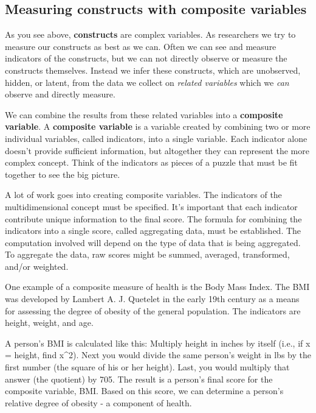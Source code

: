 \documentclass[]{book}
\theoremstyle{definition}
\theoremstyle{definition}
\theoremstyle{definition}
\theoremstyle{remark}
\begin{document}
\hypertarget{measuring-constructs-with-composite-variables}{%
\subsection{Measuring constructs with composite
variables}\label{measuring-constructs-with-composite-variables}}

As you see above, \textbf{constructs} are complex variables. As
researchers we try to measure our constructs as best as we can. Often we
can see and measure indicators of the constructs, but we can not
directly observe or measure the constructs themselves. Instead we infer
these constructs, which are unobserved, hidden, or latent, from the data
we collect on \emph{related variables} which we \emph{can} observe and
directly measure.

We can combine the results from these related variables into a
\textbf{composite variable}. A \textbf{composite variable} is a variable
created by combining two or more individual variables, called
indicators, into a single variable. Each indicator alone doesn't provide
sufficient information, but altogether they can represent the more
complex concept. Think of the indicators as pieces of a puzzle that must
be fit together to see the big picture.

A lot of work goes into creating composite variables. The indicators of
the multidimensional concept must be specified. It's important that each
indicator contribute unique information to the final score. The formula
for combining the indicators into a single score, called aggregating
data, must be established. The computation involved will depend on the
type of data that is being aggregated. To aggregate the data, raw scores
might be summed, averaged, transformed, and/or weighted.

One example of a composite measure of health is the Body Mass Index. The
BMI was developed by Lambert A. J. Quetelet in the early 19th century as
a means for assessing the degree of obesity of the general population.
The indicators are height, weight, and age.

A person's BMI is calculated like this: Multiply height in inches by
itself (i.e., if x = height, find x\^{}2). Next you would divide the
same person's weight in lbs by the first number (the square of his or
her height). Last, you would multiply that answer (the quotient) by 705.
The result is a person's final score for the composite variable, BMI.
Based on this score, we can determine a person's relative degree of
obesity - a component of health.
\end{document}
